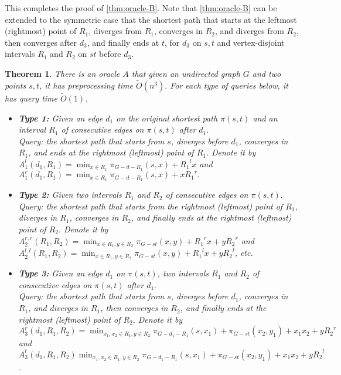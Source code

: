 \documentclass[11pt]{article}
\theoremstyle{plain}
\newtheorem{theorem}{Theorem}[section]
\theoremstyle{definition}
\newcommand{\too}[1]{\tilde{O}({#1})}
\newcommand{\zdd}[1]{{#1}^{l}}
\newcommand{\ydd}[1]{{#1}^{r}}
\begin{document}
This completes the proof of \cref{thm:oracle-B}. Note that \cref{thm:oracle-B} can be extended to the symmetric case that the shortest path that starts at the leftmost (rightmost) point of $R_1$, diverges from $R_1$, converges in $R_2$, and diverges from $R_2$, then converges after $d_3$, and finally ends at $t$, for $d_3$ on $s,t$ and vertex-disjoint intervals $R_1$ and $R_2$ on $st$ before $d_3$.


\iffalse
\begin{theorem}
There is an oracle $A$ that given an undirected graph $G$ and two points $s,t$, it has preprocessing time $\too{n^3}.$ For each type of queries below, it has query time $\too{1}$.
\begin{itemize}
    \item \textbf{Type 1:} Given an edge $d_1$ on the original shortest path $\pi(s,t)$ and an interval $R_1$ of consecutive edges on $\pi(s,t)$ after $d_1.$ 
    ~\\Query: the shortest path that starts from $s$, diverges before $d_1$, converges in $R_1$, and ends at the rightmost (leftmost) point of $R_1.$ Denote it by $A_1^l(d_1,R_1) = \min_{x \in R_1} \pi_{G-d-R_1}(s, x) + \zdd{R_1}x$ and $A_1^r(d_1,R_1) =  \min_{x \in R_1} \pi_{G-d-R_1}(s, x) + x\ydd{R_1}.$
    \item \textbf{Type 2:} Given two intervals $R_1$ and $R_2$ of consecutive edges on $\pi(s,t).$   
    ~\\Query: the shortest path that starts from the rightmost (leftmost) point of $R_1$, diverges in $R_1$, converges in $R_2$, and finally ends at the rightmost (leftmost) point of $R_2.$ Denote it by $A_2^{r,r}(R_1,R_2) = \min_{x\in R_1, y\in R_2}\pi_{G-st}(x, y) + \ydd{R_1}x+y\ydd{R_2}$ and $A_2^{l,l}(R_1,R_2) = \min_{x\in R_1, y\in R_2}\pi_{G-st}(x, y) + \zdd{R_1}x+y\zdd{R_2}$, etc.
    \item \textbf{Type 3:} Given an edge $d_1$ on $\pi(s,t)$, two intervals $R_1$ and $R_2$ of consecutive edges on $\pi(s,t)$ after $d_1.$   
    ~\\Query: the shortest path that starts from $s$, diverges before $d_1$, converges in $R_1$, and diverges in $R_1$, then converges in $R_2$, and finally ends at the rightmost (leftmost) point of $R_2.$ Denote it by $A_3^r(d_1,R_1,R_2) = \min_{x_1, x_2\in {R_1}, y\in {R_2}} \pi_{G-d_1-R_1}(s, x_1)+\pi_{G-st}(x_2, y_1)+x_1x_2+y\ydd{R_2}$ \newline and $A_3^l(d_1,R_1,R_2)\min_{x_1, x_2\in {R_1}, y\in {R_2}} \pi_{G-d_1-R_1}(s, x_1)+\pi_{G-st}(x_2, y_1)+x_1x_2+y\zdd{R_2}$.
\end{itemize}

\end{theorem}
\end{document}
